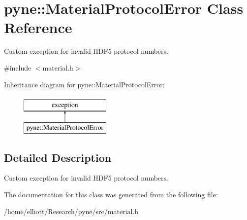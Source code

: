 \hypertarget{classpyne_1_1_material_protocol_error}{\section{pyne\-:\-:Material\-Protocol\-Error Class Reference}
\label{classpyne_1_1_material_protocol_error}
}


Custom exception for invalid H\-D\-F5 protocol numbers.  




{\ttfamily \#include $<$material.\-h$>$}

Inheritance diagram for pyne\-:\-:Material\-Protocol\-Error\-:\begin{figure}[H]
\begin{center}
\leavevmode
\includegraphics[height=2.000000cm]{classpyne_1_1_material_protocol_error}
\end{center}
\end{figure}


\subsection{Detailed Description}
Custom exception for invalid H\-D\-F5 protocol numbers. 

The documentation for this class was generated from the following file\-:\begin{DoxyCompactItemize}
\item 
/home/elliott/\-Research/pyne/src/material.\-h\end{DoxyCompactItemize}
